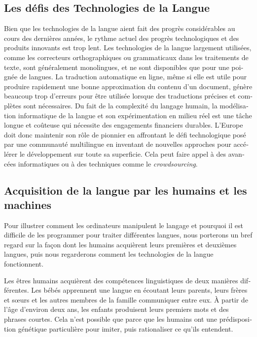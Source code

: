 \begin{french}
\begin{multicols}{2}
\subsection{Les défis des Technologies de la Langue}

Bien que les technologies de la langue aient fait des progrès
considérables au cours des dernières années, le rythme actuel des
progrès technologiques et des produits innovants est trop lent. Les
technologies de la langue largement utilisées, comme les correcteurs
orthographiques ou grammaticaux dans les traitements de texte, sont
généralement monolingues, et ne sont disponibles que pour une poignée
de langues. La traduction automatique en ligne, même si elle est utile
pour produire rapidement une bonne approximation du contenu d'un document, génère beaucoup trop d'erreurs pour être
utilisée lorsque des traductions précises et complètes sont
nécessaires. 
Du fait de la complexité du langage humain, la
modélisation informatique de la langue et son expérimentation en
milieu réel est une tâche longue et coûteuse qui nécessite des
engagements financiers durables. L'Europe doit donc maintenir
son rôle de pionnier en affrontant le défi technologique posé par une
communauté multilingue en inventant de nouvelles approches pour
accélérer le développement sur toute sa superficie. Cela peut faire
appel à des avancées informatiques ou à des techniques comme le {\it
  crowdsourcing}.

\subsection{Acquisition de la langue par les humains et les machines}

Pour illustrer comment les ordinateurs manipulent le langage et pourquoi
il est difficile de les programmer pour traiter différentes langues,
nous porterons un bref regard sur la façon dont les humains acquièrent
leurs premières et deuxièmes langues, puis nous regarderons comment
les technologies de la langue fonctionnent.

Les êtres humains acquièrent des compétences linguistiques de deux
manières différentes. Les bébés apprennent une langue en écoutant
leurs parents, leurs frères et sœurs et les autres membres de la
famille communiquer entre eux. À partir de l'âge d'environ deux ans, les enfants produisent leurs premiers mots et
des phrases courtes. Cela n'est possible que parce que les
humains ont une prédisposition génétique particulière pour imiter,
puis rationaliser ce qu'ils entendent.


\end{multicols}
\end{french}
